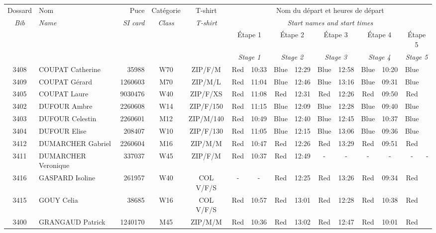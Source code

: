 \documentclass{report}
\begin{document}
  \begin{longtable}{|c|l|r|c|c|*{5}{cc|}}
    Dossard & Nom  & Puce    & Catégorie & T-shirt & \multicolumn{10}{c|}{Nom du départ et heures de départ} \\
    \itshape Bib     & \itshape Name & \itshape SI card & \itshape Class  & \itshape  T-shirt  & \multicolumn{10}{c|}{\itshape Start names and start times} \\
    \hline
    & & & & & \multicolumn{2}{c|}{Étape 1} & \multicolumn{2}{c|}{Étape 2} & \multicolumn{2}{c|}{Étape 3} & \multicolumn{2}{c|}{Étape 4} & \multicolumn{2}{c|}{Étape 5} \\
    & & & & & \multicolumn{2}{c|}{\itshape Stage 1} & \multicolumn{2}{c|}{\itshape Stage 2} & \multicolumn{2}{c|}{\itshape Stage 3} & \multicolumn{2}{c|}{\itshape Stage 4} & \multicolumn{2}{c|}{\itshape Stage 5} \\
    \hline
    3408 & COUPAT Catherine & 35988 & W70 & ZIP/F/M & Red & 10:33 & Blue & 12:29 & Blue & 12:58 & Blue & 10:20 & Blue &  \\
    3409 & COUPAT Gérard & 1260603 & M70 & ZIP/M/L & Red & 11:04 & Blue & 12:46 & Blue & 13:16 & Blue & 09:31 & Blue &  \\
    3405 & COUPAT Laure & 9030476 & W40 & ZIP/F/XS & Red & 11:08 & Red & 12:31 & Red & 12:26 & Red & 09:50 & Red &  \\
    3402 & DUFOUR Ambre & 2260608 & W14 & ZIP/F/150 & Red & 11:15 & Blue & 12:09 & Blue & 12:28 & Blue & 09:40 & Blue &  \\
    3403 & DUFOUR Celestin & 2260601 & M12 & ZIP/M/140 & Red & 10:49 & Blue & 12:40 & Blue & 12:45 & Blue & 10:37 & Blue &  \\
    3404 & DUFOUR Elise & 208407 & W10 & ZIP/F/130 & Red & 11:05 & Blue & 12:15 & Blue & 13:06 & Blue & 09:36 & Blue &  \\
    3412 & DUMARCHER Gabriel & 2260604 & M16 & ZIP/M/M & Red & 10:47 & Red & 12:26 & Red & 13:29 & Red & 09:51 & Red &  \\
    3411 & DUMARCHER Veronique & 337037 & W45 & ZIP/F/M & Red & 10:37 & Red & 12:49 & - &  - & - &  - & - &  -\\
    3416 & GASPARD Isoline & 261957 & W40 & COL V/F/S & - &  - & Red & 12:25 & Red & 13:26 & Red & 09:34 & Red &  \\
    3415 & GOUY Celia & 38685 & W16 & COL V/F/S & Red & 10:57 & Red & 13:01 & Red & 12:28 & Red & 10:38 & Red &  \\
    3400 & GRANGAUD Patrick & 1240170 & M45 & ZIP/M/M & Red & 10:36 & Red & 13:02 & Red & 12:47 & Red & 10:01 & Red &  \\

\end{longtable}
\end{document}
